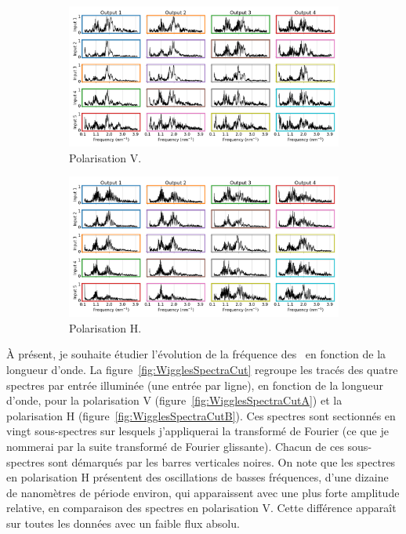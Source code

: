 \begin{figure}[ht!]
    \centering
    \begin{subfigure}{0.8\textwidth}
        \centering
        \includegraphics[width=\textwidth]{Figure_Chap4/20220811_P2VM_01_Flat1_InputOutput_Spectra_fft_Pola1.png}
        \caption{Polarisation V.}
        \label{fig:WigglesFFTGlobalA}
    \end{subfigure}
    \begin{subfigure}{0.8\textwidth}
        \centering
        \includegraphics[width=\textwidth]{Figure_Chap4/20220811_P2VM_01_Flat1_InputOutput_Spectra_fft_Pola2.png}
        \caption{Polarisation H.}
        \label{fig:WigglesFFTGlobalB}
    \end{subfigure}
    \caption[]{}
    \label{fig:WigglesFFTGlobal}
\end{figure}

À présent, je souhaite étudier l'évolution de la fréquence des \wiggles~en fonction de la longueur d'onde. La figure~\ref{fig:WigglesSpectraCut} regroupe les tracés des quatre spectres par entrée illuminée (une entrée par ligne), en fonction de la longueur d'onde, pour la polarisation V (figure~\ref{fig:WigglesSpectraCutA}) et la polarisation H (figure~\ref{fig:WigglesSpectraCutB}). Ces spectres sont sectionnés en vingt sous-spectres sur lesquels j'appliquerai la transformé de Fourier (ce que je nommerai par la suite transformé de Fourier glissante). Chacun de ces sous-spectres sont démarqués par les barres verticales noires. On note que les spectres en polarisation H présentent des oscillations de basses fréquences, d'une dizaine de nanomètres de période environ, qui apparaissent avec une plus forte amplitude relative, en comparaison des spectres en polarisation V. Cette différence apparaît sur toutes les données avec un faible flux absolu. 

